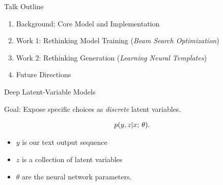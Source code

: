 
\begin{frame}{Talk Outline}
  \begin{enumerate}
  \item Background: Core Model and Implementation
    \air
  \item Work 1: Rethinking Model Training (\textit{Beam Search Optimization})
    \air

  \item Work 2: Rethinking  Generation  (\textit{Learning Neural Templates})
    \air

  \item Future Directions
  \end{enumerate}
\end{frame}




\begin{frame}{Deep Latent-Variable Models}

  Goal: Expose specific choices as \textit{discrete} latent variables.


\begin{align*}
p(y, z | x ; \, \theta).
\end{align*}

\pause
\begin{itemize}
    \item $y$ is our text output sequence
    \item $z$ is a collection of latent variables
    \item $\theta$ are the neural network parameters.
\end{itemize}



\end{frame}

